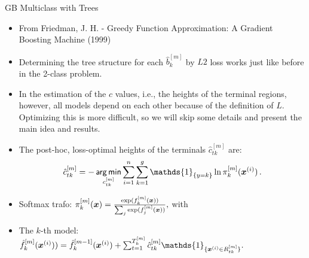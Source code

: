 \begin{vbframe}{GB Multiclass with Trees}

\begin{itemize}
  \item From Friedman, J. H. - Greedy Function Approximation: A Gradient Boosting Machine (1999)
  \item Determining the tree structure for each $\hat{b}^{[m]}_k$ by $L2$ loss works just like before in the 2-class problem.
\item In the estimation of the $c$ values, i.e., the heights of the terminal regions, however, all models depend on each other because of the definition
of $L$. Optimizing this is more difficult, so we will skip some details and present the main idea and results.
\end{itemize}

\framebreak

\begin{itemize}
  \item The post-hoc, loss-optimal heights of the terminals $\hat{c}_{tk}^{[m]}$ are:
  $$ 
  \hat{c}_{tk}^{[m]} = - \argmin_{c_{tk}^{[m]} } \sum_{i=1}^n \sum_{k=1}^g \mathds{1}_{\{y = k\}} \ln \pi_k^{[m]}(\xv^{(i)}) \,.
  $$
\item Softmax trafo: $\pi_k^{[m]}(\bm{x}) = \frac{\exp(f_k^{[m]}(\bm{x}))}{\sum_j \exp(f_j^{[m]}(\bm{x}))},$ with 
\item The $k$-th model:
  $
  \hat{f}_k^{[m]}(\xv^{(i)})) = \hat{f}_k^{[m-1]}(\xv^{(i)}) + \sum_{t=1}^{T_k^{[m]}} \hat{c}_{tk}^{[m]} \mathds{1}_{\{\xv^{(i)} \in R_{tk}^{[m]}\}}. 
  $

\end{itemize}







\end{vbframe}
